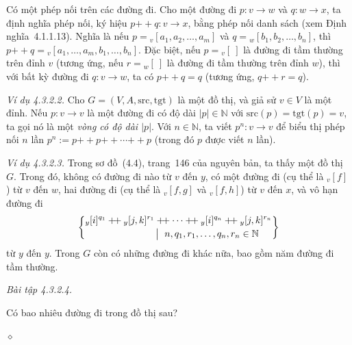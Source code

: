 Có một phép nối trên các đường đi. Cho một đường đi $p:v\to w$ và $q:w\to x$, ta định nghĩa phép nối, ký hiệu $p\mathbin{+\!+}q:v\to x$, bằng phép nối danh sách (xem Định nghĩa~4.1.1.13). Nghĩa là nếu $p={}_v[a_1,a_2,\ldots,a_m]$ và $q={}_w[b_1,b_2,\ldots,b_n]$, thì $p\mathbin{+\!+}q={}_v[a_1,\ldots,a_m,b_1,\ldots,b_n]$. Đặc biệt, nếu $p={}_v[\ ]$ là đường đi tầm thường trên đỉnh $v$ (tương ứng, nếu $r={}_w[\ ]$ là đường đi tầm thường trên đỉnh $w$), thì với bất kỳ đường đi $q:v\to w$, ta có $p\mathbin{+\!+}q=q$ (tương ứng, $q\mathbin{+\!+}r=q$).

\noindent\textit{Ví dụ 4.3.2.2.} Cho $G=(V,A,\mathrm{src},\mathrm{tgt})$ là một đồ thị, và giả sử $v\in V$ là một đỉnh. Nếu $p:v\to v$ là một đường đi có độ dài $|p|\in\mathbb{N}$ với $\mathrm{src}(p)=\mathrm{tgt}(p)=v$, ta gọi nó là một \emph{vòng có độ dài $|p|$}. Với $n\in\mathbb{N}$, ta viết $p^n:v\to v$ để biểu thị phép nối $n$ lần $p^n:=p\mathbin{+\!+}p\mathbin{+\!+}\cdots\mathbin{+\!+}p$ (trong đó $p$ được viết $n$ lần).

\noindent\textit{Ví dụ 4.3.2.3.} Trong sơ đồ~(4.4), trang~146 của nguyên bản, ta thấy một đồ thị $G$. Trong đó, không có đường đi nào từ $v$ đến $y$, có một đường đi (cụ thể là ${}_v[f]$) từ $v$ đến $w$, hai đường đi (cụ thể là ${}_v[f,g]$ và ${}_v[f,h]$) từ $v$ đến $x$, và vô hạn đường đi
\[
\left\{
\begin{aligned}
&{}_y[i]^{q_1}\mathbin{+\!+}{}_y[j,k]^{r_1}\mathbin{+\!+}\cdots
\mathbin{+\!+}{}_y[i]^{q_n}\mathbin{+\!+}{}_y[j,k]^{r_n}\\[-2pt]
&\hspace{25mm}\bigm|\ n,q_1,r_1,\ldots,q_n,r_n\in\mathbb{N}
\end{aligned}
\right\}
\]
từ $y$ đến $y$. Trong $G$ còn có những đường đi khác nữa, bao gồm năm đường đi tầm thường.

\noindent\textit{Bài tập 4.3.2.4.}\keepwithnext

Có bao nhiêu đường đi trong đồ thị sau?
\begin{samepage}
\begin{center}
\end{center}
\hfill$\diamond$
\end{samepage}

